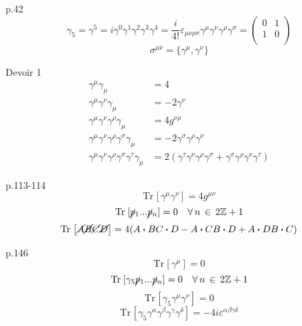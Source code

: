 \documentclass[12pt]{article}
\newcommand{\Z}{\mathbb{Z}}
\newcommand{\Tr}[1]{\mathrm{Tr}\hspace{1pt}\left[#1\right]}
\newcommand{\bdot}[0]{\boldsymbol{\cdot}}
\begin{document}
p.42
\begin{equation}
  \gamma_5 = \gamma^5 = i\gamma^0\gamma^1\gamma^2\gamma^3\gamma^4 = \frac{i}{4!}\varepsilon_{\mu\nu\rho\sigma}\gamma^\mu\gamma^\nu\gamma^\rho\gamma^\sigma=\begin{pmatrix}0 & 1 \\ 1 & 0\\
\end{pmatrix}
\end{equation}
\begin{equation}
  \sigma^{\mu\nu} = \{\gamma^\mu,\gamma^\nu\}
\end{equation}

Devoir 1
\begin{align}
  \gamma^\mu\gamma_\mu &= 4 \\
  \gamma^\mu\gamma^\nu\gamma_\mu &= -2\gamma^\nu \\
  \gamma^\mu\gamma^\nu\gamma^\rho\gamma_\mu &= 4g^{\nu\rho}\\
  \gamma^\mu\gamma^\nu\gamma^\rho\gamma^\sigma\gamma_\mu &= -2\gamma^\sigma\gamma^\rho\gamma^\nu\\
  \gamma^\mu\gamma^\nu\gamma^\rho\gamma^\sigma\gamma^\tau\gamma_\mu &= 2(\gamma^\tau\gamma^\nu\gamma^\rho\gamma^\sigma + \gamma^\sigma\gamma^\rho\gamma^\nu\gamma^\tau)
\end{align}

p.113-114
\begin{equation}
  \Tr{\gamma^\mu\gamma^\nu} = 4g^{\mu\nu}
\end{equation}
\begin{equation}
  \Tr{\cancel{p}_1...\cancel{p}_n} = 0 \quad \forall\, n\, \in \, 2\Z+1
\end{equation}
\begin{equation}
  \Tr{\cancel{A}\cancel{B}\cancel{C}\cancel{D}} = 4(A\bdot B C \bdot D - A \bdot C B \bdot D + A \bdot D B \bdot C )
\end{equation}

p.146
\begin{equation}
  \Tr{\gamma^\mu} = 0
\end{equation}
\begin{equation}
  \Tr{\gamma_5\cancel{p}_1...\cancel{p}_n} = 0 \quad \forall\, n\, \in \, 2\Z+1
\end{equation}
\begin{equation}
  \Tr{\gamma_5\gamma^\mu\gamma^\nu} = 0
\end{equation}
\begin{equation}
  \Tr{\gamma_5\gamma^\alpha\gamma^\beta\gamma^\gamma\gamma^\delta} = -4i\varepsilon^{\alpha\beta\gamma\delta}
\end{equation}
\end{document}
